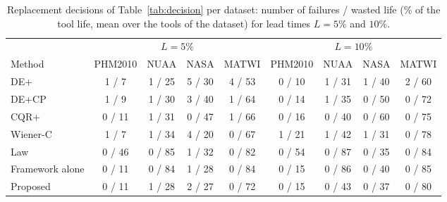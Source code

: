 \begin{table}[!htbp]
\centering
\caption{Replacement decisions of Table~\ref{tab:decision} per dataset: number of failures / wasted life (\% of the tool life, mean over the tools of the dataset) for lead times $L=5\%$ and $10\%$.}
\label{tab:Sdecds}
\footnotesize\setlength{\tabcolsep}{3pt}
\begin{tabular}{lcccccccc}
\toprule
 & \multicolumn{4}{c}{$L=5\%$} & \multicolumn{4}{c}{$L=10\%$}\\
\cmidrule(lr){2-5}\cmidrule(lr){6-9}
Method & PHM2010 & NUAA & NASA & MATWI & PHM2010 & NUAA & NASA & MATWI\\
\midrule
DE+ & 1 / 7 & 1 / 25 & 5 / 30 & 4 / 53 & 0 / 10 & 1 / 31 & 1 / 40 & 2 / 60\\
DE+CP & 1 / 9 & 1 / 30 & 3 / 40 & 1 / 64 & 0 / 14 & 1 / 35 & 0 / 50 & 0 / 72\\
CQR+ & 0 / 11 & 1 / 31 & 0 / 47 & 1 / 66 & 0 / 16 & 0 / 40 & 0 / 60 & 0 / 75\\
Wiener-C & 1 / 7 & 1 / 34 & 4 / 20 & 0 / 67 & 1 / 21 & 1 / 42 & 1 / 31 & 0 / 78\\
Law & 0 / 46 & 0 / 85 & 1 / 32 & 0 / 82 & 0 / 54 & 0 / 87 & 0 / 35 & 0 / 84\\
Framework alone & 0 / 11 & 0 / 84 & 1 / 28 & 0 / 84 & 0 / 15 & 0 / 86 & 0 / 40 & 0 / 85\\
Proposed & 0 / 11 & 1 / 28 & 2 / 27 & 0 / 72 & 0 / 15 & 0 / 43 & 0 / 37 & 0 / 80\\
\bottomrule
\end{tabular}
\end{table}
